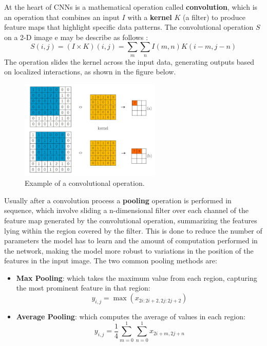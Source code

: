 At the heart of CNNs is a mathematical operation called \textbf{convolution}, which is an operation that combines an input $I$ with a \textbf{kernel} $K$ (a filter) to produce feature maps that highlight specific data patterns. The  convolutional operation $S$ on a 2-D image e may be describe
as follows \cite{lecun1989generalization}:
\[
S(i, j) = (I \times K)(i, j) = \sum_m \sum_n I(m, n) K(i - m, j - n)
\]
The operation slides the kernel across the input data, generating outputs based on localized interactions, as shown in the figure below.
\begin{figure}[H] 
    \centering
    \includegraphics[width=0.6\textwidth]{Machine_learning_thesis/Images/Convolution.png}
    \caption{Example of a convolutional operation.} 
    \label{fig:convolution} 
\end{figure}
Usually after a convolution process a \textbf{pooling} operation is performed in sequence, which involve sliding a n-dimensional filter over each channel of the feature map generated by the convolutional operation, summarizing the features lying within the region covered by the filter. This is done to  reduce the number of parameters the model has to learn and the amount of computation performed in the network, making the model more robust to variations in the position of the features in the input image. The two common pooling methods are:
\begin{itemize}
    \item \textbf{Max Pooling}: which takes the maximum value from each region, capturing the most prominent feature in that region:
    \[
    y_{i,j} = \max(x_{2i:2i+2, 2j:2j+2})
    \]
    \item \textbf{Average Pooling}: which computes the average of values in each region:
    \[
    y_{i,j} = \frac{1}{4} \sum_{m=0}^{1} \sum_{n=0}^{1} x_{2i+m, 2j+n}
    \]
\end{itemize}
